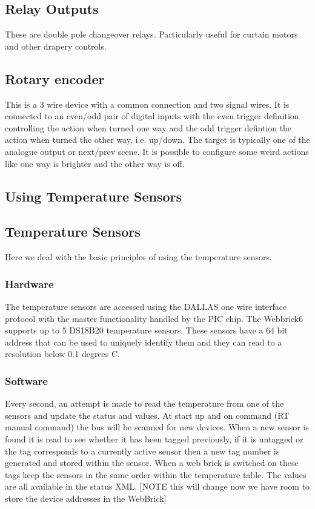 	\subsection{Relay Outputs}
	
		These are double pole changeover relays. Particularly useful for curtain motors and other drapery controls. 

	\subsection{Rotary encoder}

		This is a 3 wire device with a common connection and two signal wires. It is connected to an even/odd pair
of digital inputs with the even trigger definition controlling the action when turned one way and the odd trigger 
defintion the action when turned the other way, i.e. up/down. The target is typically one of the analogue output 
or next/prev scene. It is possible to configure some weird actions like one way is brighter and the other way is off.

	\subsection{Using Temperature Sensors}
	\subsection{Temperature Sensors}


	Here we deal with the basic principles of using the temperature sensors.

	\subsubsection{Hardware}

	The temperature sensors are accessed using the DALLAS one wire interface protocol with the master
	functionality handled by the PIC chip. The Webbrick6 supports up to 5 DS18B20 temperature sensors. 
	These sensors have a 64 bit address that 
	can be used to uniquely identify them and they can read to a resolution below 0.1 degrees C.

	\subsubsection{Software}

	Every second, an attempt is made to read the temperature from one of the sensors and update 
	the status and values. At start up and on command (RT manual command) the bus will be scanned for new devices. 
	When a new sensor is found it is read to see whether it has been tagged previously, if it 
	is untagged or the tag corresponds to a currently active sensor then a new tag number is 
	generated and stored within the sensor. When a web brick is switched on these tags 
	keep the sensors in the same order within the temperature table. The values are all 
	available in the status XML. [NOTE this will change now we have room to store the device
	addresses in the WebBrick]

